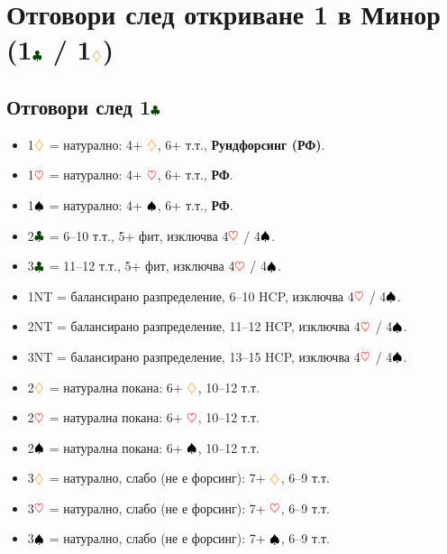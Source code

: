\documentclass[10pt,a5paper]{extarticle}
\newcommand{\Rheart}{\textcolor{red}{\heartsuit}}
\newcommand{\Rdiamond}{\textcolor{orange}{\diamondsuit}}
\newcommand{\Bspade}{\textcolor{black}{\spadesuit}}
\newcommand{\Bclub}{\textcolor{darkgreen}{\clubsuit}}
\begin{document}

\newpage
\section{Отговори след откриване 1 в Минор (1$\Bclub$ / 1$\Rdiamond$)}

\subsection*{Отговори след 1$\Bclub$}
\begin{itemize}
  \item[] 1$\Rdiamond$ = натурално: 4+ $\Rdiamond$, 6+ т.т., \textbf{Рундфорсинг (РФ)}.
  \item[] 1$\Rheart$ = натурално: 4+ $\Rheart$, 6+ т.т., \textbf{РФ}.
  \item[] 1$\Bspade$ = натурално: 4+ $\Bspade$, 6+ т.т., \textbf{РФ}.
  \item[] 2$\Bclub$ = 6–10 т.т., 5+ фит, изключва 4$\Rheart$ / 4$\Bspade$.
  \item[] 3$\Bclub$ = 11–12 т.т., 5+ фит, изключва 4$\Rheart$ / 4$\Bspade$.
  \item[] 1NT = балансирано разпределение, 6–10 HCP, изключва 4$\Rheart$ / 4$\Bspade$.
  \item[] 2NT = балансирано разпределение, 11–12 HCP, изключва 4$\Rheart$ / 4$\Bspade$.
  \item[] 3NT = балансирано разпределение, 13–15 HCP, изключва 4$\Rheart$ / 4$\Bspade$.
  \item[] 2$\Rdiamond$ = натурална покана: 6+ $\Rdiamond$, 10–12 т.т.
  \item[] 2$\Rheart$ = натурална покана: 6+ $\Rheart$, 10–12 т.т.
  \item[] 2$\Bspade$ = натурална покана: 6+ $\Bspade$, 10–12 т.т.
  \item[] 3$\Rdiamond$ = натурално, слабо (не е форсинг): 7+ $\Rdiamond$, 6–9 т.т.
  \item[] 3$\Rheart$ = натурално, слабо (не е форсинг): 7+ $\Rheart$, 6–9 т.т.
  \item[] 3$\Bspade$ = натурално, слабо (не е форсинг): 7+ $\Bspade$, 6–9 т.т.
\end{itemize}
\end{document}
